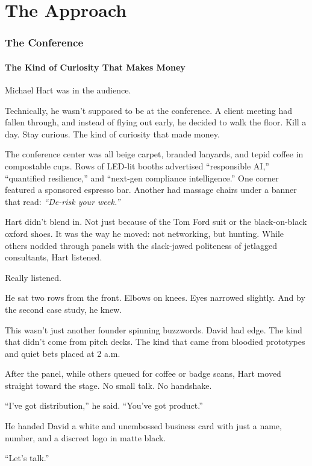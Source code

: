 \part{The Approach}

\section{The Conference}

\subsection{The Kind of Curiosity That Makes Money}

Michael Hart was in the audience.

Technically, he wasn’t supposed to be at the conference. A client meeting had fallen through, and instead 
of flying out early, he decided to walk the floor. Kill a day. Stay curious. The kind of curiosity 
that made money.

The conference center was all beige carpet, branded lanyards, and tepid coffee in compostable cups. Rows of 
LED-lit booths advertised “responsible AI,” “quantified resilience,” and “next-gen compliance intelligence.” 
One corner featured a sponsored espresso bar. Another had massage chairs under a banner that read: 
\textit{“De-risk your week.”}

Hart didn’t blend in. Not just because of the Tom Ford suit or the black-on-black oxford shoes. It was the 
way he moved: not networking, but hunting. While others nodded through panels with the slack-jawed politeness 
of jetlagged consultants, Hart listened.

Really listened.

He sat two rows from the front. Elbows on knees. Eyes narrowed slightly. And by the second case study, he knew.

This wasn’t just another founder spinning buzzwords. David had edge. The kind that didn’t come from pitch decks. 
The kind that came from bloodied prototypes and quiet bets placed at 2 a.m.

After the panel, while others queued for coffee or badge scans, Hart moved straight toward the stage. No small talk. 
No handshake.

“I’ve got distribution,” he said. “You’ve got product.”

He handed David a white and unembossed business card with just a name, number, and a discreet logo in matte black.

“Let’s talk.”

